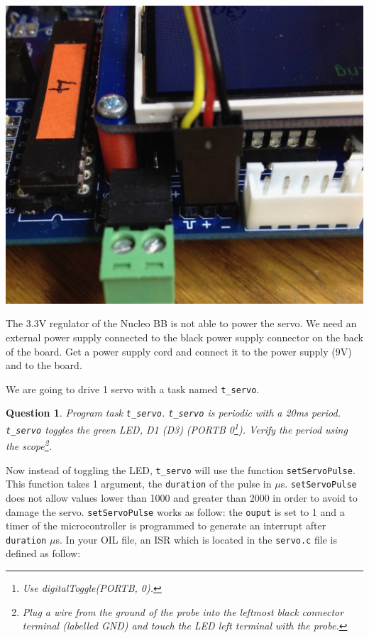 \documentclass[11pt]{report}
\newtheorem{ex}{Question}
\begin{document}
\begin{center}
   \includegraphics[scale=0.25]{img/servoconnection.jpg}
\end{center}

The 3.3V regulator of the Nucleo BB is not able to power the servo. We need an external power supply connected to the black power supply connector on the back of the board. Get a power supply cord and connect it to the power supply (9V) and to the board.

We are going to drive 1 servo with a task named \texttt{t_servo}.

\begin{ex}
Program task \texttt{t_servo}. \texttt{t_servo} is periodic with a 20ms period. \texttt{t_servo} toggles the green LED, D1 (D3) (PORTB 0\footnote{Use digitalToggle(PORTB, 0).}). Verify the period using the scope\footnote{Plug a wire from the ground of the probe into the leftmost black connector terminal (labelled GND) and touch the LED left terminal with the probe.}.
\end{ex}


Now instead of toggling the LED, \texttt{t_servo} will use the function \texttt{setServoPulse}. This function takes 1 argument, the \texttt{duration} of the pulse in $\mu$s.  \texttt{setServoPulse} does not allow values lower than 1000 and greater than 2000 in order to avoid to damage the servo. \texttt{setServoPulse} works as follow: the \texttt{ouput} is set to 1 and a timer of the microcontroller is programmed to generate an interrupt after \texttt{duration} $\mu$s. In your OIL file, an ISR which is located in the \texttt{servo.c} file is defined as follow:
\end{document}
